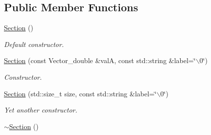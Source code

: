 \subsection*{Public Member Functions}
\begin{DoxyCompactItemize}
\item 
\hypertarget{classSection_a77b88e06692841ba49559d22a25a09f9}{
\hyperlink{classSection_a77b88e06692841ba49559d22a25a09f9}{Section} ()}
\label{classSection_a77b88e06692841ba49559d22a25a09f9}

\begin{DoxyCompactList}\small\item\em Default constructor. \item\end{DoxyCompactList}\item 
\hyperlink{classSection_ab2a565295bdf8ebb07663aa3442b8957}{Section} (const Vector\_\-double \&valA, const std::string \&label=\char`\"{}$\backslash$0\char`\"{})
\begin{DoxyCompactList}\small\item\em Constructor. \item\end{DoxyCompactList}\item 
\hyperlink{classSection_a8228979f357bdfeeb7ebb91b5c1d1a2c}{Section} (std::size\_\-t size, const std::string \&label=\char`\"{}$\backslash$0\char`\"{})
\begin{DoxyCompactList}\small\item\em Yet another constructor. \item\end{DoxyCompactList}\item 
\hypertarget{classSection_ae2582a77c7ecb8cbd4a1b58e7ad3296e}{
\hyperlink{classSection_ae2582a77c7ecb8cbd4a1b58e7ad3296e}{$\sim$Section} ()}
\label{classSection_ae2582a77c7ecb8cbd4a1b58e7ad3296e}


\end{DoxyCompactItemize}
